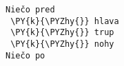 \begin{Verbatim}[commandchars=\\\{\}]
Niečo pred
 \PY{k}{\PYZhy{}} hlava
 \PY{k}{\PYZhy{}} trup
 \PY{k}{\PYZhy{}} nohy
Niečo po
\end{Verbatim}
